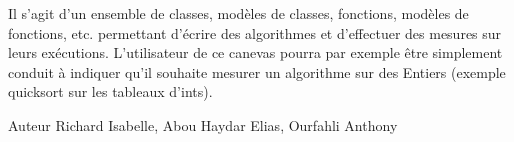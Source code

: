 Il s'agit d'un ensemble de classes, modèles de classes, fonctions, modèles de fonctions, etc. permettant d’écrire des algorithmes et d’effectuer des mesures sur leurs exécutions. L’utilisateur de ce canevas pourra par exemple être simplement conduit à indiquer qu’il souhaite mesurer un algorithme sur des Entiers (exemple quicksort sur les tableaux d’ints).

\begin{DoxyAuthor}{Auteur}
Richard Isabelle, Abou Haydar Elias, Ourfahli Anthony 
\end{DoxyAuthor}
